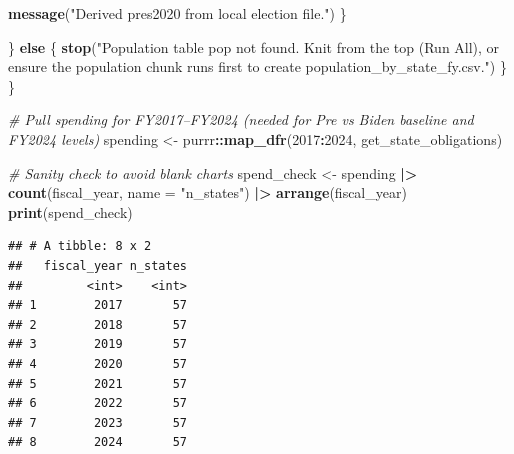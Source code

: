 \documentclass[
  11pt,
]{article}
\newenvironment{Shaded}{\begin{snugshade}}{\end{snugshade}}
\newcommand{\AttributeTok}[1]{\textcolor[rgb]{0.13,0.29,0.53}{#1}}
\newcommand{\CommentTok}[1]{\textcolor[rgb]{0.56,0.35,0.01}{\textit{#1}}}
\newcommand{\ControlFlowTok}[1]{\textcolor[rgb]{0.13,0.29,0.53}{\textbf{#1}}}
\newcommand{\DecValTok}[1]{\textcolor[rgb]{0.00,0.00,0.81}{#1}}
\newcommand{\FunctionTok}[1]{\textcolor[rgb]{0.13,0.29,0.53}{\textbf{#1}}}
\newcommand{\NormalTok}[1]{#1}
\newcommand{\OtherTok}[1]{\textcolor[rgb]{0.56,0.35,0.01}{#1}}
\newcommand{\SpecialCharTok}[1]{\textcolor[rgb]{0.81,0.36,0.00}{\textbf{#1}}}
\newcommand{\StringTok}[1]{\textcolor[rgb]{0.31,0.60,0.02}{#1}}
\begin{document}
\begin{Shaded}
\begin{Highlighting}[]
  \FunctionTok{message}\NormalTok{(}\StringTok{"Derived pres2020 from local election file."}\NormalTok{)}
\NormalTok{\}}

\NormalTok{  \} }\ControlFlowTok{else}\NormalTok{ \{}
    \FunctionTok{stop}\NormalTok{(}\StringTok{"Population table \textasciigrave{}pop\textasciigrave{} not found. Knit from the top (Run All), or ensure the population chunk runs first to create population\_by\_state\_fy.csv."}\NormalTok{)}
\NormalTok{  \}}
\NormalTok{\}}


\CommentTok{\# Pull spending for FY2017–FY2024 (needed for Pre vs Biden baseline and FY2024 levels)}
\NormalTok{spending }\OtherTok{\textless{}{-}}\NormalTok{ purrr}\SpecialCharTok{::}\FunctionTok{map\_dfr}\NormalTok{(}\DecValTok{2017}\SpecialCharTok{:}\DecValTok{2024}\NormalTok{, get\_state\_obligations)}

\CommentTok{\# Sanity check to avoid blank charts}
\NormalTok{spend\_check }\OtherTok{\textless{}{-}}\NormalTok{ spending }\SpecialCharTok{|\textgreater{}}
  \FunctionTok{count}\NormalTok{(fiscal\_year, }\AttributeTok{name =} \StringTok{"n\_states"}\NormalTok{) }\SpecialCharTok{|\textgreater{}}
  \FunctionTok{arrange}\NormalTok{(fiscal\_year)}
\FunctionTok{print}\NormalTok{(spend\_check)}
\end{Highlighting}
\end{Shaded}

\begin{verbatim}
## # A tibble: 8 x 2
##   fiscal_year n_states
##         <int>    <int>
## 1        2017       57
## 2        2018       57
## 3        2019       57
## 4        2020       57
## 5        2021       57
## 6        2022       57
## 7        2023       57
## 8        2024       57
\end{verbatim}
\end{document}
